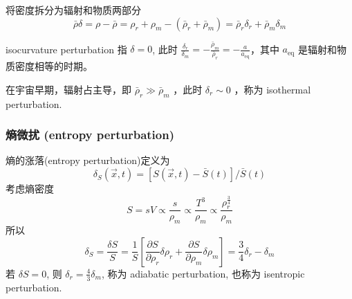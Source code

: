 \documentclass[12pt]{ctexart}
\begin{document}
将密度拆分为辐射和物质两部分
\begin{equation}
    \bar{\rho}\delta = \rho-\bar{\rho} = \rho_r + \rho_m - \left(\bar{\rho}_r + \bar{\rho}_m\right) = \bar{\rho}_r \delta_r + \bar{\rho}_m \delta_m
\end{equation}

isocurvature perturbation 指 $\delta = 0$, 此时 $\frac{\delta_r}{\delta_m} = -\frac{\bar{\rho}_m}{\bar{\rho}_r} = -\frac{a}{a_\text{eq}}$，其中 $a_\text{eq}$ 是辐射和物质密度相等的时期。


在宇宙早期，辐射占主导，即 $\bar{\rho}_r \gg \bar{\rho}_m$ ，此时 $\delta_r\sim 0$ ，称为 isothermal perturbation.


\subsubsection{熵微扰 (entropy perturbation)}

熵的涨落(entropy perturbation)定义为
\begin{equation}
    \delta_S\left(\vec{x},t\right) = \left[S\left(\vec{x},t\right)-\bar{S}(t)\right]/\bar{S}(t)
\end{equation}
考虑熵密度
\begin{equation}
    S = sV \propto \frac{s}{\rho_m} \propto \frac{T^3}{\rho_m}  \propto \frac{\rho_r^{\frac{3}{4}}}{\rho_m}
\end{equation}
所以 %
\begin{equation}
    \delta_S = \frac{\delta S}{S} = \frac{1}{S} \left[\frac{\partial S}{\partial \rho_r}\delta \rho_r + \frac{\partial S}{\partial \rho_m}\delta \rho_m\right] = \frac{3}{4}\delta_r -\delta_m
\end{equation}
若 $\delta S=0$, 则 $\delta_r = \frac{4}{3} \delta_m$, 称为 adiabatic perturbation, 也称为 isentropic perturbation.
\end{document}
